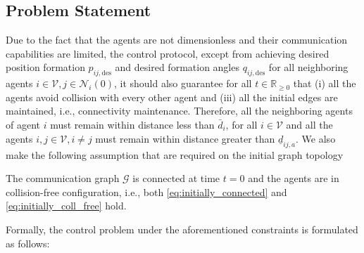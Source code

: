\subsection{Problem Statement}
Due to the fact that the agents are not dimensionless and their communication
capabilities are limited, the control protocol, except from achieving desired
position formation $p_{ij, \text{des}}$ and desired formation angles
$q_{ij, \text{des}}$ for all neighboring agents
$i \in \mathcal{V}, j \in \mathcal{N}_i(0)$, it should also guarantee for
all $t\in\mathbb{R}_{\geq 0}$ that (i) all the agents avoid collision with
every other agent and (iii) all the initial edges are maintained, i.e.,
connectivity maintenance. Therefore, all the neighboring agents of agent $i$
must remain within distance less than $\bar{d}_{i}$, for all $i \in \mathcal{V}$
and all the agents $i, j\in \mathcal{V}, i \neq j$ must remain within distance
greater than $\underline{d}_{ij,a}$. We also make the following assumption that
are required on the initial graph topology

\begin{assumption}
	The communication graph $\mathcal{G}$ is connected at time $t = 0$ and the
  agents are in collision-free configuration, i.e.,
  both \eqref{eq:initially_connected} and \eqref{eq:initially_coll_free} hold.
\end{assumption}

Formally, the control problem under the aforementioned constraints is
formulated as follows:

